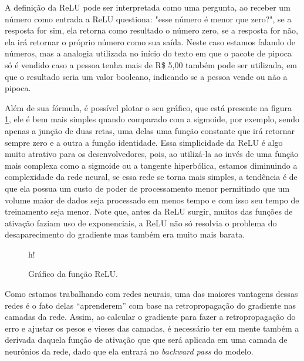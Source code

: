 A definição da ReLU pode ser interpretada como uma pergunta, ao receber um número como entrada a ReLU questiona: "esse número é menor que zero?", se a resposta for sim, ela retorna como resultado o número zero, se a resposta for não, ela irá retornar o próprio número como sua saída. Neste caso estamos falando de números, mas a analogia utilizada no início do texto em que o pacote de pipoca só é vendido caso a pessoa tenha mais de R\$ 5,00 também pode ser utilizada, em que o resultado seria um valor booleano, indicando se a pessoa vende ou não a pipoca.

Além de sua fórmula, é possível plotar o seu gráfico, que está presente na figura \ref{fig:relu}, ele é bem mais simples quando comparado com a sigmoide, por exemplo, sendo apenas a junção de duas retas, uma delas uma função constante que irá retornar sempre zero e a outra a função identidade. Essa simplicidade da ReLU é algo muito atrativo para os desenvolvedores, pois, ao utilizá-la ao invés de uma função mais complexa como a sigmoide ou a tangente hiperbólica, estamos diminuindo a complexidade da rede neural, se essa rede se torna mais simples, a tendência é de que ela possua um custo de poder de processamento menor permitindo que um volume maior de dados seja processado em menos tempo e com isso seu tempo de treinamento seja menor. Note que, antes da ReLU surgir, muitos das funções de ativação faziam uso de exponenciais, a ReLU não só resolvia o problema do desaparecimento do gradiente mas também era muito mais barata.

\begin{figure}{h!}
        \centering
        \caption{Gráfico da função ReLU.}
        \label{fig:relu}
\end{figure}

Como estamos trabalhando com redes neurais, uma das maiores vantagens dessas redes é o fato delas “aprenderem” com base na retropropagação do gradiente nas camadas da rede. Assim, ao calcular o gradiente para fazer a retropropagação do erro e ajustar os pesos e vieses das camadas, é necessário ter em mente também a derivada daquela função de ativação que que será aplicada em uma camada de neurônios da rede, dado que ela entrará no \textit{backward pass} do modelo.

